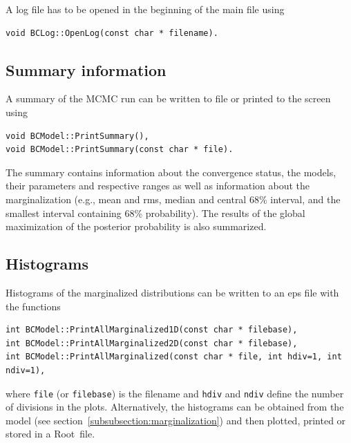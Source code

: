 \documentclass[11pt, a4paper]{article}
\newcommand{\Root}{{\sc Root}}
\begin{document}
A log file has to be opened in the beginning of the main file using
%
\begin{verbatim}
void BCLog::OpenLog(const char * filename).
\end{verbatim}


\subsection{Summary information}

A summary of the MCMC run can be written to file or printed to the
screen using
%
\begin{verbatim}
void BCModel::PrintSummary(),
void BCModel::PrintSummary(const char * file).
\end{verbatim}

The summary contains information about the convergence status, the
models, their parameters and respective ranges as well as information
about the marginalization (e.g., mean and rms, median and central 68\%
interval, and the smallest interval containing 68\% probability). The
results of the global maximization of the posterior probability is
also summarized.


\subsection{Histograms}

Histograms of the marginalized distributions can be written to an
eps file with the functions
%
\begin{verbatim}
int BCModel::PrintAllMarginalized1D(const char * filebase),
int BCModel::PrintAllMarginalized2D(const char * filebase),
int BCModel::PrintAllMarginalized(const char * file, int hdiv=1, int ndiv=1),
\end{verbatim}
%
where \verb|file| (or \verb|filebase|) is the filename and \verb|hdiv|
and \verb|ndiv| define the number of divisions in the
plots. Alternatively, the histograms can be obtained from the model
(see section~\ref{subsubsection:marginalization}) and then plotted,
printed or stored in a \Root\ file.
\end{document}
